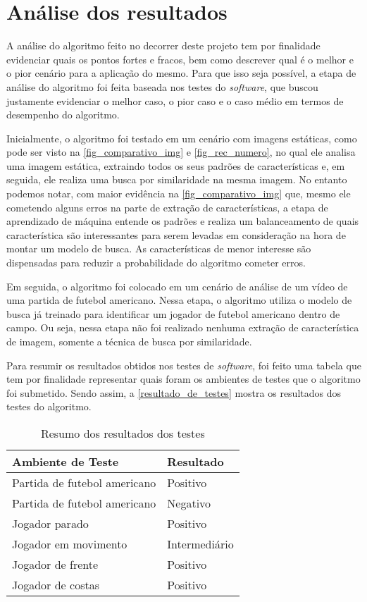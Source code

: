 \section{\textbf{Análise dos resultados}}
\label{ref_analise_dos_resultados}
A análise do algoritmo feito no decorrer deste projeto tem por finalidade evidenciar quais os pontos fortes e fracos, bem como descrever qual é o melhor e o pior cenário para a aplicação do mesmo. Para que isso seja possível, a etapa de análise do algoritmo foi feita baseada nos testes do \textit{software}, que buscou justamente evidenciar o melhor caso, o pior caso e o caso médio em termos de desempenho do algoritmo.

Inicialmente, o algoritmo foi testado em um cenário com imagens estáticas, como pode ser visto na \autoref{fig_comparativo_img} e \autoref{fig_rec_numero}, no qual ele analisa uma imagem estática, extraindo todos os seus padrões de características e, em seguida, ele realiza uma busca por similaridade na mesma imagem. No entanto podemos notar, com maior evidência na  \autoref{fig_comparativo_img} que, mesmo ele cometendo alguns erros na parte de extração de características, a etapa de aprendizado de máquina entende os padrões e realiza  um balanceamento de quais característica são interessantes para serem levadas em consideração na hora de montar um modelo de busca. As características de menor interesse são dispensadas para reduzir a probabilidade do algoritmo cometer erros.

Em seguida, o algoritmo foi colocado em um cenário de análise de um vídeo de uma partida de futebol americano. Nessa etapa, o algoritmo utiliza o modelo de busca já treinado para identificar um jogador de futebol americano dentro de campo. Ou seja, nessa etapa não foi realizado nenhuma extração de característica de imagem, somente a técnica de busca por similaridade.

Para resumir os resultados obtidos nos testes de \textit{software}, foi feito uma tabela que tem por finalidade representar quais foram os ambientes de testes que o algoritmo foi submetido. Sendo assim, a \autoref{resultado_de_testes} mostra os resultados dos testes do algoritmo.

\begin{table}[h]
\centering
\caption{Resumo dos resultados dos testes}
\label{resultado_de_testes}
\begin{tabular}{l|l} 
\hline
\hline
\multicolumn{1}{l|}{Ambiente de Teste} & \multicolumn{1}{l}{Resultado}  \\ 
\hline
Partida de futebol americano & Positivo\\
Partida de futebol americano & Negativo\\
Jogador parado & Positivo\\
Jogador em movimento & Intermediário\\
Jogador de frente & Positivo\\
Jogador de costas & Positivo\\
\hline
\hline 
\end{tabular}
\end{table}